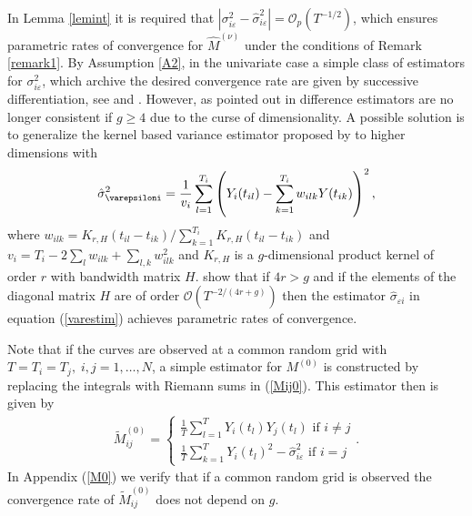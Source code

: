 In Lemma \ref{lemint} it is required that $| \sigma_{i\varepsilon}^2 - \hat{\sigma}_{i\varepsilon}^2|=\mathcal{O}_p(T^{-1/2})$, which ensures parametric rates of convergence for $\hat{M}^{(\nu)}$ under the conditions of Remark \ref{remark1}. By Assumption \ref{A2}, in the univariate case a simple class of estimators for $\sigma_{i\varepsilon}^2$,  which archive the desired convergence rate are given by successive differentiation, see \cite{Neumann1941} and \cite{Rice:84}. However, as pointed out in \cite{Munk2005} difference estimators are no longer consistent if $g \geq 4$ due to the curse of dimensionality. A possible solution is to generalize the kernel based variance estimator proposed by \cite{hall1990} to higher dimensions with
\begin{equation}
\label{varestim}
\hat{\sigma}^2_{\varepsiloni} = \frac{1}{v_i} \sum_{l=1}^{T_i} \left( Y_i(t_{il}) - \sum_{k=1}^{T_i} w_{ilk} Y(t_{ik})\right)^2,
\end{equation}
where $w_{ilk}=K_{r,{H}}(t_{il} - t_{ik})/ \sum_{k=1}^{T_i} K_{r,{H}}(t_{il} - t_{ik}) $ and $v_i=T_i - 2 \sum_l w_{ilk} + \sum_{l,k} w_{ilk}^2$ and $K_{r,{H}}$ is  a $g$-dimensional product kernel of order $r$ with bandwidth matrix ${H}$. \cite{Munk2005} show that if $4r>g$ and if the elements of the diagonal matrix $H$ are of order $\mathcal{O}(T^{-2/(4r+g)})$ then the estimator $\hat{\sigma}_{\varepsilon i}$ in equation (\ref{varestim}) achieves parametric rates of convergence.


Note that if the curves are observed at a common random grid with $T=T_i=T_j, \; i,j=1,\dots,N$, a simple estimator for $M^{(0)}$ is constructed by replacing the integrals with Riemann sums in (\ref{Mij0}). This estimator then is given by
\begin{eqnarray}\label{Mdf}
\tilde{M}^{(0)}_{ij}= \begin{cases}  \frac{1}{T} \sum_{l=1}^{T} Y_i(t_l) Y_j(t_l) \text{ if } i \neq j  \\ 
\frac{1}{T} \sum_{k=1}^{T} Y_i(t_l)^2- \hat{\sigma}_{i\varepsilon}^2  \text{ if } i = j \end{cases} .%
\end{eqnarray}
In Appendix (\ref{M0}) we verify that if a common random grid is observed the convergence rate of $\tilde{M}^{(0)}_{ij}$ does not depend on $g$. 

